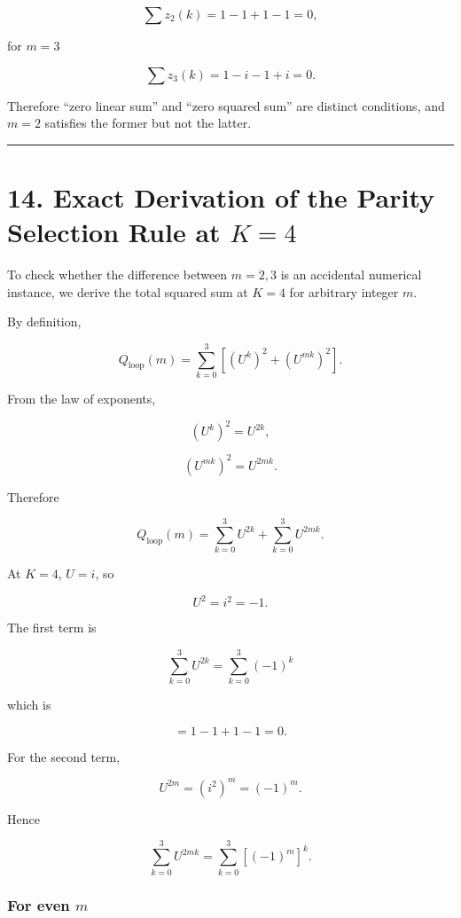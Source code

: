 \documentclass[
  a4paper,
]{article}
\begin{document}
\[
\sum z_2(k)
=
1-1+1-1
=
0,
\]

for \(m=3\)

\[
\sum z_3(k)
=
1-i-1+i
=
0.
\]

Therefore ``zero linear sum'' and ``zero squared sum'' are distinct
conditions, and \(m=2\) satisfies the former but not the latter.

\begin{center}\rule{0.5\linewidth}{0.5pt}\end{center}

\section{\texorpdfstring{14. Exact Derivation of the Parity Selection
Rule at
\(K=4\)}{14. Exact Derivation of the Parity Selection Rule at K=4}}\label{exact-derivation-of-the-parity-selection-rule-at-k4}

To check whether the difference between \(m=2,3\) is an accidental
numerical instance, we derive the total squared sum at \(K=4\) for
arbitrary integer \(m\).

By definition,

\[
Q_{\mathrm{loop}}(m)
=
\sum_{k=0}^{3}
\left[(U^k)^2+(U^{mk})^2\right].
\]

From the law of exponents,

\[
(U^k)^2
=
U^{2k},
\]

\[
(U^{mk})^2
=
U^{2mk}.
\]

Therefore

\[
Q_{\mathrm{loop}}(m)
=
\sum_{k=0}^{3}U^{2k}
+
\sum_{k=0}^{3}U^{2mk}.
\]

At \(K=4\), \(U=i\), so

\[
U^2=i^2=-1.
\]

The first term is

\[
\sum_{k=0}^{3}U^{2k}
=
\sum_{k=0}^{3}(-1)^k
\]

which is

\[
=1-1+1-1
=0.
\]

For the second term,

\[
U^{2m}
=(i^2)^m
=(-1)^m.
\]

Hence

\[
\sum_{k=0}^{3}U^{2mk}
=
\sum_{k=0}^{3}\left[(-1)^m\right]^k.
\]

\subsubsection{\texorpdfstring{For even
\(m\)}{For even m}}\label{for-even-m}
\end{document}
